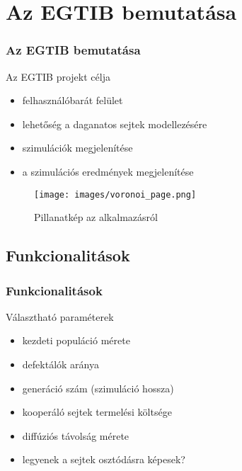\section{Az EGTIB bemutatása}
\begin{frame}
	\frametitle{Az EGTIB bemutatása}
	\begin{block}{Az EGTIB projekt célja}
		\begin{itemize}
			\item felhasználóbarát felület
			\item lehetőség a daganatos sejtek modellezésére 
			\item szimulációk megjelenítése
			\item a szimulációs eredmények megjelenítése
		\end{itemize}
	\end{block}

	\begin{figure}[ht!]
		\centering
		\texttt{[image: images/voronoi\_page.png]}
		\caption{Pillanatkép az alkalmazásról}
		\label{fig:SimulateWithDiagram}
	\end{figure}
\end{frame}

\subsection{Funkcionalitások}
\begin{frame}
	\frametitle{Funkcionalitások}
	\begin{block}{Választható paraméterek}
		\begin{itemize}
			\item kezdeti populáció mérete
			\item defektálók aránya 
			\item generáció szám (szimuláció hossza)
			\item kooperáló sejtek termelési költsége 
			\item diffúziós távolság mérete
			\item legyenek a sejtek osztódásra képesek?
		\end{itemize}
	\end{block}
\end{frame}

